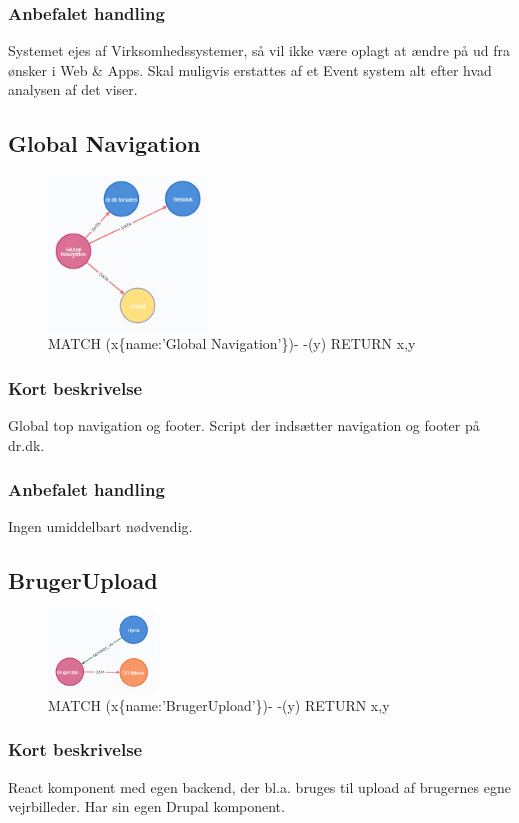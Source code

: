 \documentclass{article}
\begin{document}
\subsubsection{Anbefalet handling}
Systemet ejes af Virksomhedssystemer, så vil ikke være oplagt at ændre på ud fra ønsker i Web \& Apps. 
Skal muligvis erstattes af et Event system alt efter hvad analysen af det viser.


\subsection{Global Navigation}
\begin{figure}[h]
\includegraphics[width=120pt]{GlobalNavigation.PNG}
\caption{MATCH (x\{name:'Global Navigation'\})- -(y) RETURN x,y}
\end{figure}
\subsubsection{Kort beskrivelse}
Global top navigation og footer.
Script der indsætter navigation og footer på dr.dk.
\subsubsection{Anbefalet handling}
Ingen umiddelbart nødvendig.


\subsection{BrugerUpload}
\begin{figure}[h]
\includegraphics[width=80pt]{BrugerUpload.PNG}
\caption{MATCH (x\{name:'BrugerUpload'\})- -(y) RETURN x,y}
\end{figure}
\subsubsection{Kort beskrivelse}
React komponent med egen backend, der bl.a. bruges til upload af brugernes egne vejrbilleder. Har sin egen Drupal komponent.
\end{document}
